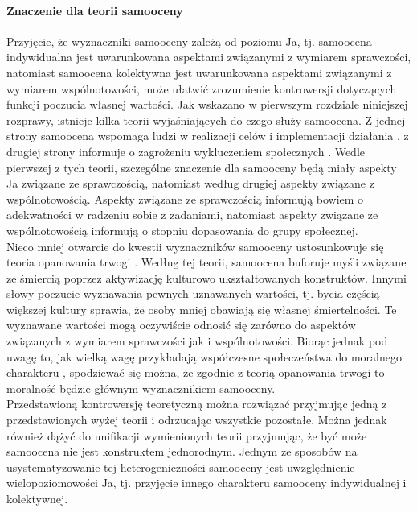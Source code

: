 \documentclass[man]{apa6}
\begin{document}
\paragraph{Znaczenie dla teorii samooceny} Przyjęcie, że wyznaczniki samooceny zależą od poziomu Ja, tj. samoocena indywidualna jest uwarunkowana aspektami związanymi z wymiarem sprawczości, natomiast samoocena kolektywna jest uwarunkowana aspektami związanymi z wymiarem wspólnotowości, może ułatwić zrozumienie kontrowersji dotyczących funkcji poczucia własnej wartości. Jak wskazano w pierwszym rozdziale niniejszej rozprawy, istnieje kilka teorii wyjaśniających do czego służy samoocena. Z jednej strony samoocena wspomaga ludzi w realizacji celów i implementacji działania \parencite{bandura1994self}, z drugiej strony informuje o zagrożeniu wykluczeniem społecznych \parencite{leary2000nature}. Wedle pierwszej z tych teorii, szczególne znaczenie dla samooceny będą miały aspekty Ja związane ze sprawczością, natomiast według drugiej aspekty związane z wspólnotowością. Aspekty związane ze sprawczością informują bowiem o adekwatności w radzeniu sobie z zadaniami, natomiast aspekty związane ze wspólnotowością informują o stopniu dopasowania do grupy społecznej. \\

Nieco mniej otwarcie do kwestii wyznaczników samooceny ustosunkowuje się teoria opanowania trwogi \parencite{pyszczynski2004people}. Według tej teorii, samoocena buforuje myśli związane ze śmiercią poprzez aktywizację kulturowo ukształtowanych konstruktów. Innymi słowy poczucie wyznawania pewnych uznawanych wartości, tj. bycia częścią większej kultury sprawia, że osoby mniej obawiają się własnej śmiertelności. Te wyznawane wartości mogą oczywiście odnosić się zarówno do aspektów związanych z wymiarem sprawczości jak i wspólnotowości. Biorąc jednak pod uwagę to, jak wielką wagę przykładają współczesne społeczeństwa do moralnego charakteru \parencite[np.,][]{goodwin2014moral}, spodziewać się można, że zgodnie z teorią opanowania trwogi to moralność będzie głównym wyznacznikiem samooceny.\\

Przedstawioną kontrowersję teoretyczną można rozwiązać przyjmując jedną z przedstawionych wyżej teorii i odrzucając wszystkie pozostałe. Można jednak również dążyć do unifikacji wymienionych teorii przyjmując, że być może samoocena nie jest konstruktem jednorodnym. Jednym ze sposobów na usystematyzowanie tej heterogeniczności samooceny jest uwzględnienie wielopoziomowości Ja, tj. przyjęcie innego charakteru samooceny indywidualnej i kolektywnej.\\
\end{document}

